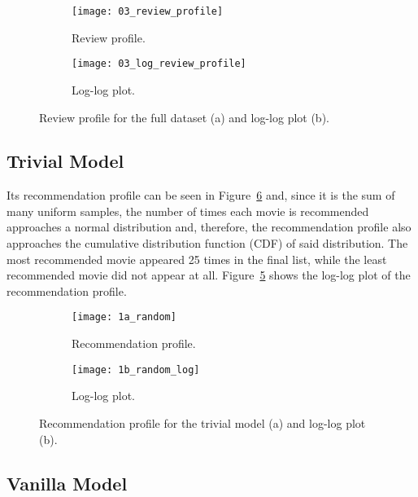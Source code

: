 \begin{figure}
  \centering
  \begin{subfigure}{0.45\textwidth}
    \centering
    \texttt{[image: 03\_review\_profile]}
    \caption{Review profile.\label{fig:fig03_review_profile}}
  \end{subfigure}
  \begin{subfigure}{0.45\textwidth}
    \centering
    \texttt{[image: 03\_log\_review\_profile]}
    \caption{Log-log plot.\label{fig:fig03_log_review_profile}}
  \end{subfigure}
  \caption{Review profile for the full dataset (a) and log-log
  plot (b).\label{fig:fig03_review_profile_both}}
\end{figure}

\subsection{Trivial Model}
\label{subsec:trivial}

Its recommendation profile can be seen in Figure~\ref{fig:fig1} and, since it is
the sum of many uniform samples, the number of times each movie is recommended
approaches a normal distribution and, therefore, the recommendation profile also
approaches the cumulative distribution function (CDF) of said distribution. The
most recommended movie appeared 25 times in the final list, while the least
recommended movie did not appear at all. Figure~\ref{fig:fig1b} shows the
log-log plot of the recommendation profile.

\begin{figure}
  \centering
  \begin{subfigure}{0.45\textwidth}
    \centering
    \texttt{[image: 1a\_random]}
    \caption{Recommendation profile.\label{fig:fig1a}}
  \end{subfigure}
  \begin{subfigure}{0.45\textwidth}
    \centering
    \texttt{[image: 1b\_random\_log]}
    \caption{Log-log plot.\label{fig:fig1b}}
  \end{subfigure}
  \caption{Recommendation profile for the trivial model (a) and log-log plot
    (b).\label{fig:fig1}}
\end{figure}

\subsection{Vanilla Model}
\label{subsec:vanilla}

